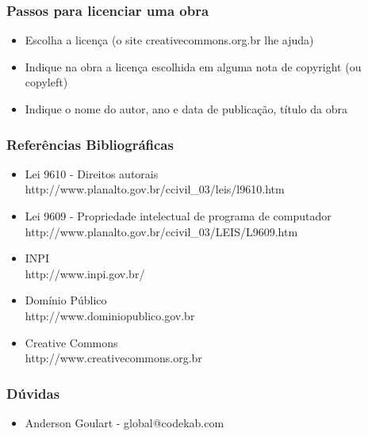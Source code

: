 \documentclass{beamer}
\begin{document}
\frame
{
	\frametitle{Passos para licenciar uma obra}
	\begin{itemize}
		\item Escolha a licença (o site creativecommons.org.br lhe ajuda)
		\item Indique na obra a licença escolhida em alguma nota de copyright (ou copyleft)
		\item Indique o nome do autor, ano e data de publicação, título da obra
	\end{itemize}
}

\frame
{
	\frametitle{Referências Bibliográficas}
	\begin{itemize}
		\item Lei 9610 - Direitos autorais\\
		http://www.planalto.gov.br/ccivil\_03/leis/l9610.htm
		\item Lei 9609 - Propriedade intelectual de programa de computador\\
		http://www.planalto.gov.br/ccivil\_03/LEIS/L9609.htm
		\item INPI\\
		http://www.inpi.gov.br/
		\item Domínio Público\\
		http://www.dominiopublico.gov.br
		\item Creative Commons\\
		http://www.creativecommons.org.br
	\end{itemize}

}

\frame
{
	\frametitle{Dúvidas}
	\begin{itemize}
		\item Anderson Goulart - global@codekab.com
	\end{itemize}
	

}
\end{document}
